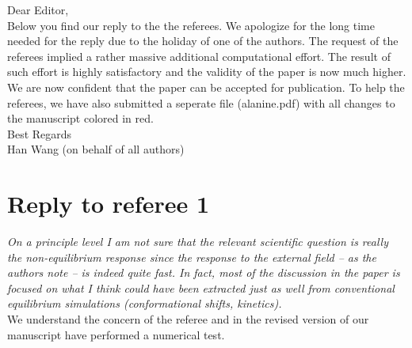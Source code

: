 \documentclass[]{revtex4-1}
\begin{document}
Dear Editor,\\

Below you find our reply to the the referees. We apologize for the long time needed for the reply due to the holiday of one of the authors.
The request of the referees implied a rather massive additional computational effort.
The result of such effort is highly satisfactory and the validity of the paper is now much higher.
We are now confident that the paper can be accepted for publication.
To help the referees, we have also submitted a seperate file (alanine.pdf) with all changes to the manuscript colored in red.
\\

Best Regards\\


Han Wang (on behalf of all authors) 
\section*{Reply to referee 1}

\emph{On a principle level I am not sure that the relevant scientific
  question is really the non-equilibrium response since the response
  to the external field -- as the authors note -- is indeed quite
  fast. In fact, most of the discussion in the paper is focused on
  what I think could have been extracted just as well from
  conventional equilibrium simulations (conformational shifts,
  kinetics).}\\

We understand the concern of the referee and in the revised version of our manuscript have performed a numerical test.
\end{document}
